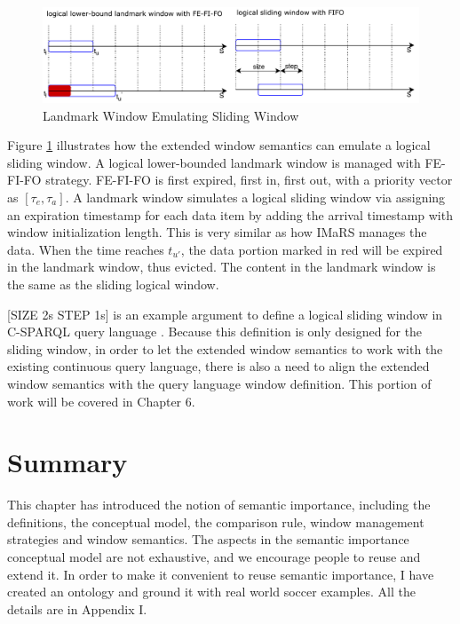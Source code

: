 \begin{figure}[!htbp]
	\centering
    \includegraphics[width=5in]{img/3-lwcsw.pdf}
    \caption{Landmark Window Emulating Sliding Window} 
    \label{fig:lwesw}
\end{figure}

Figure \ref{fig:lwesw} illustrates how the extended window semantics can emulate a logical sliding window.
A logical lower-bounded landmark window is managed with FE-FI-FO strategy.
FE-FI-FO is first expired, first in, first out, with a priority vector as $[\tau_{e}, \tau_{a}]$. 
A landmark window simulates a logical sliding window via assigning an expiration timestamp for each data item by adding the arrival timestamp with window initialization length.
This is very similar as how IMaRS \cite{barbieri2010incremental} manages the data. 
When the time reaches $t_{u'}$, the data portion marked in red will be expired in the landmark window, thus evicted. 
The content in the landmark window is the same as the sliding logical window. 

[SIZE 2s STEP 1s] is an example argument to define a logical sliding window in C-SPARQL query language \cite{barbieri2009c}.
Because this definition is only designed for the sliding window, in order to let the extended window semantics to work with the existing continuous query language, there is also a need to align the extended window semantics with the query language window definition.
This portion of work will be covered in Chapter 6. 
%
\section{Summary}
This chapter has introduced the notion of semantic importance, including the definitions, the conceptual model, the comparison rule, window management strategies and window semantics. 
The aspects in the semantic importance conceptual model are not exhaustive, and we encourage people to reuse and extend it. 
In order to make it convenient to reuse semantic importance, I have created an ontology and ground it with real world soccer examples. 
All the details are in Appendix I. 

